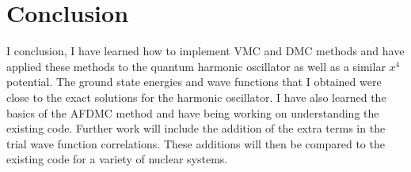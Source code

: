 \section*{Conclusion}
I conclusion, I have learned how to implement VMC and DMC methods and have applied these methods to the quantum harmonic oscillator as well as a similar $x^4$ potential. The ground state energies and wave functions that I obtained were close to the exact solutions for the harmonic oscillator. I have also learned the basics of the AFDMC method and have being working on understanding the existing code. Further work will include the addition of the extra terms in the trial wave function correlations. These additions will then be compared to the existing code for a variety of nuclear systems.

